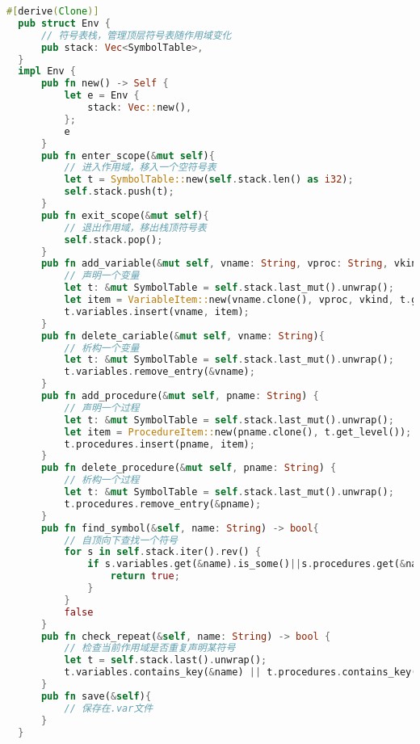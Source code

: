\begin{lstlisting}[caption={符号表控制器env.rs}, label={5:code-example}, captionpos=t, language=rust]
  #[derive(Clone)]
  pub struct Env {
      // 符号表栈，管理顶层符号表随作用域变化
      pub stack: Vec<SymbolTable>,
  }
  impl Env {
      pub fn new() -> Self {
          let e = Env {
              stack: Vec::new(),
          };
          e
      }
      pub fn enter_scope(&mut self){
          // 进入作用域，移入一个空符号表
          let t = SymbolTable::new(self.stack.len() as i32);
          self.stack.push(t);
      }
      pub fn exit_scope(&mut self){
          // 退出作用域，移出栈顶符号表
          self.stack.pop();
      }
      pub fn add_variable(&mut self, vname: String, vproc: String, vkind: i32){
          // 声明一个变量
          let t: &mut SymbolTable = self.stack.last_mut().unwrap();
          let item = VariableItem::new(vname.clone(), vproc, vkind, t.get_level());
          t.variables.insert(vname, item);
      }
      pub fn delete_cariable(&mut self, vname: String){
          // 析构一个变量
          let t: &mut SymbolTable = self.stack.last_mut().unwrap();
          t.variables.remove_entry(&vname);
      }
      pub fn add_procedure(&mut self, pname: String) {
          // 声明一个过程
          let t: &mut SymbolTable = self.stack.last_mut().unwrap();
          let item = ProcedureItem::new(pname.clone(), t.get_level());
          t.procedures.insert(pname, item);
      }
      pub fn delete_procedure(&mut self, pname: String) {
          // 析构一个过程
          let t: &mut SymbolTable = self.stack.last_mut().unwrap();
          t.procedures.remove_entry(&pname);
      }
      pub fn find_symbol(&self, name: String) -> bool{
          // 自顶向下查找一个符号
          for s in self.stack.iter().rev() {
              if s.variables.get(&name).is_some()||s.procedures.get(&name).is_some() {
                  return true;
              }
          }
          false
      }
      pub fn check_repeat(&self, name: String) -> bool {
          // 检查当前作用域是否重复声明某符号
          let t = self.stack.last().unwrap(); 
          t.variables.contains_key(&name) || t.procedures.contains_key(&name)
      }
      pub fn save(&self){
          // 保存在.var文件
      }
  }
\end{lstlisting}